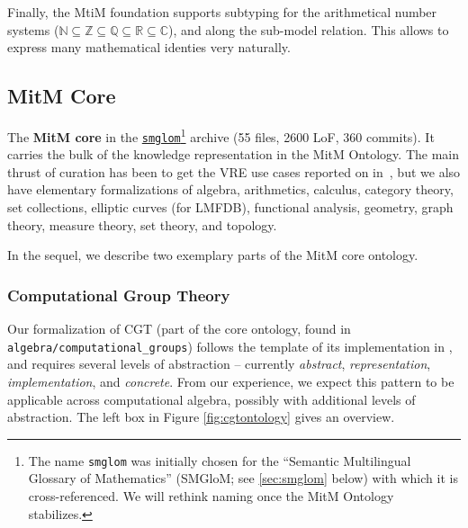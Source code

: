 Finally, the MtiM foundation supports subtyping for the arithmetical number systems ($\mathbb{N}\subseteq\mathbb{Z}\subseteq\mathbb{Q}\subseteq\mathbb{R}\subseteq\mathbb{C}$), and along the sub-model relation.
This allows to express many mathematical identies very naturally.


\subsection{MitM Core}

The \textbf{MitM core} in the \href{https://gl.mathhub.info/MitM/smglom}{\texttt{smglom}}\footnote{The name \texttt{smglom} was initially chosen for the ``Semantic Multilingual Glossary of Mathematics'' (SMGloM; see \ref{sec:smglom} below) with which it is cross-referenced. We will rethink naming once the MitM Ontology stabilizes.}  archive (55 files, 2600 LoF, 360 commits).
It carries the bulk of the knowledge representation in the MitM Ontology.
The main thrust of curation has been to get the VRE use cases reported on in~\cite{ODK-D6.5}, but we also have elementary formalizations of algebra, arithmetics, calculus, category theory, set collections, elliptic curves (for LMFDB), functional analysis, geometry, graph theory, measure theory, set theory, and topology.

In the sequel, we describe two exemplary parts of the MitM core ontology.

\subsubsection{Computational Group Theory}
Our formalization of CGT (part of the core ontology, found in \texttt{algebra/computational\_groups}) follows the template of its implementation in \GAP, and requires several levels of abstraction -- currently \emph{abstract}, \emph{representation}, \emph{implementation}, and \emph{concrete}. From our experience, we expect this pattern to be applicable across computational algebra, possibly with additional levels of abstraction. 
The left box in Figure \ref{fig:cgtontology} gives an overview.

